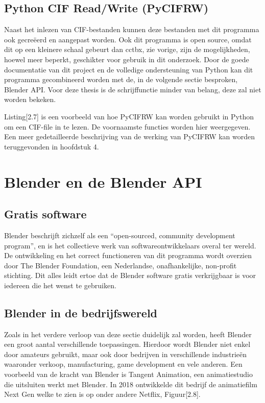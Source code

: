 \subsection{Python CIF Read/Write (PyCIFRW)}
Naast het inlezen van CIF-bestanden kunnen deze bestanden met dit programma ook gecreëerd en aangepast worden. Ook dit programma is open source, omdat dit op een kleinere schaal gebeurt dan cctbx, zie vorige, zijn de mogelijkheden, hoewel meer beperkt, geschikter voor gebruik in dit onderzoek. Door de goede documentatie van dit project en de volledige ondersteuning van Python kan dit programma gecombineerd worden met de, in de volgende sectie besproken, Blender API. \citep*{PYCIFRW1} Voor deze thesis is de schrijffunctie minder van belang, deze zal niet worden bekeken. 

\lstset{caption = Werken met PyCIFRW in Python3}


\par 
Listing[2.7] is een voorbeeld van hoe PyCIFRW kan worden gebruikt in Python om een CIF-file in te lezen. De voornaamste functies worden hier weergegeven. Een meer gedetailleerde beschrijving van de werking van PyCIFRW kan worden teruggevonden in hoofdstuk 4.

\section{Blender en de Blender API}

\subsection{Gratis software}
Blender beschrijft zichzelf als een \enquote{open-sourced, community development program}, en is het collectieve werk van softwareontwikkelaars overal ter wereld. \citep*{BLEN1} De ontwikkeling en het correct functioneren van dit programma wordt overzien door The Blender Foundation, een Nederlandse, onafhankelijke, non-profit stichting. Dit alles leidt ertoe dat de Blender software gratis verkrijgbaar is voor iedereen die het wenst te gebruiken.

\subsection{Blender in de bedrijfswereld}
Zoals in het verdere verloop van deze sectie duidelijk zal worden, heeft Blender een groot aantal verschillende toepassingen. Hierdoor wordt Blender niet enkel door amateurs gebruikt, maar ook door bedrijven in verschillende industrieën waaronder verkoop, manufacturing, game development en vele anderen. Een voorbeeld van de kracht van Blender is Tangent Animation, een animatiestudio die uitsluiten werkt met Blender. In 2018 ontwikkelde dit bedrijf de animatiefilm Next Gen welke te zien is op onder andere Netflix, Figuur[2.8].
\par


